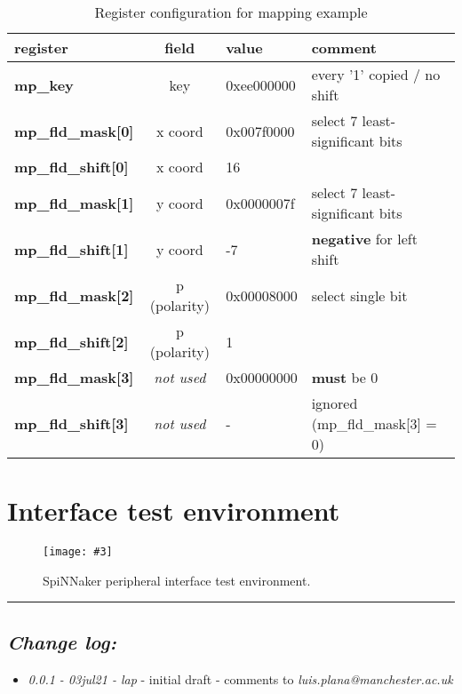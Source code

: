 \documentclass[11pt,a4paper,twoside]{article}
\newcommand{\image}[5][]
{
\begin{figure}[#2]
   \begin{center}
      \texttt{[image: \#3]}
      \caption{#5}
      \label{fig:#4}
   \end{center}
\end{figure}
}
\begin{document}
\begin{table}[!ht]
	\begin{center}
		\begin{tabular}{| l c l l |}
			\hline
			\textbf{register}          & \textbf{field}                    & \textbf{value} & \textbf{comment}                 \\%
			\hline
			\hline
			\textbf{mp\_key}           & \cellcolor{green!50}key           & 0xee000000     & every '1' copied / no shift      \\%
			\textbf{mp\_fld\_mask[0]}  & \cellcolor{brown!85}x coord       & 0x007f0000     & select 7 least-significant bits  \\%
			\textbf{mp\_fld\_shift[0]} & \cellcolor{brown!85}x coord       & 16             &                                  \\%
			\textbf{mp\_fld\_mask[1]}  & \cellcolor{violet!50}y coord      & 0x0000007f     & select 7 least-significant bits  \\%
			\textbf{mp\_fld\_shift[1]} & \cellcolor{violet!50}y coord      & -7             & \textbf{negative} for left shift \\%
			\textbf{mp\_fld\_mask[2]}  & \cellcolor{yellow!50}p (polarity) & 0x00008000     & select single bit                \\%
			\textbf{mp\_fld\_shift[2]} & \cellcolor{yellow!50}p (polarity) & 1              &                                  \\%
			\textbf{mp\_fld\_mask[3]}  & \textit{not used}                 & 0x00000000     & \textbf{must} be 0               \\%
			\textbf{mp\_fld\_shift[3]} & \textit{not used}                 & -              & ignored (mp\_fld\_mask[3] = 0)   \\%
			\hline
		\end{tabular}
		\caption{Register configuration for mapping example}
	\end{center}
	\label{tab:map_regs}
\end{table}


\clearpage
\section{Interface test environment}


\image[width = 0.8 \textwidth]{!h}{spif_test_env}{fig:spif_test}
{SpiNNaker peripheral interface test environment.}


\vspace*{1.0cm}
\par\noindent\rule{\linewidth}{2pt}


\subsection*{\itshape Change log:}


\begin{itemize}
	\item {\itshape 0.0.1 - 03jul21 - lap} - initial draft - comments to
	{\itshape luis.plana@manchester.ac.uk}
\end{itemize}
\end{document}
